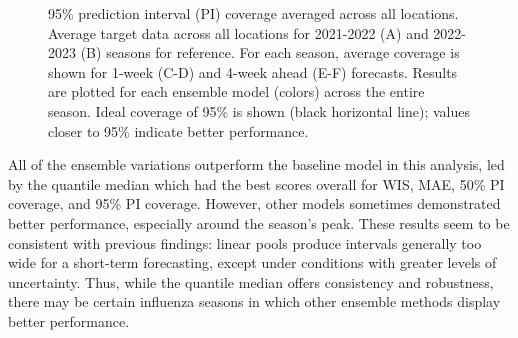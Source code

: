 \documentclass[
  letterpaper,
  DIV=11,
  numbers=noendperiod]{scrartcl}
\begin{document}
\begin{figure}


\caption{\label{fig-cov95-vs-forecast-date}95\% prediction interval (PI)
coverage averaged across all locations. Average target data across all
locations for 2021-2022 (A) and 2022-2023 (B) seasons for reference. For
each season, average coverage is shown for 1-week (C-D) and 4-week ahead
(E-F) forecasts. Results are plotted for each ensemble model (colors)
across the entire season. Ideal coverage of 95\% is shown (black
horizontal line); values closer to 95\% indicate better performance.}

\end{figure}%

All of the ensemble variations outperform the baseline model in this
analysis, led by the quantile median which had the best scores overall
for WIS, MAE, 50\% PI coverage, and 95\% PI coverage. However, other
models sometimes demonstrated better performance, especially around the
season's peak. These results seem to be consistent with previous
findings: linear pools produce intervals generally too wide for a
short-term forecasting, except under conditions with greater levels of
uncertainty. Thus, while the quantile median offers consistency and
robustness, there may be certain influenza seasons in which other
ensemble methods display better performance.
\end{document}
